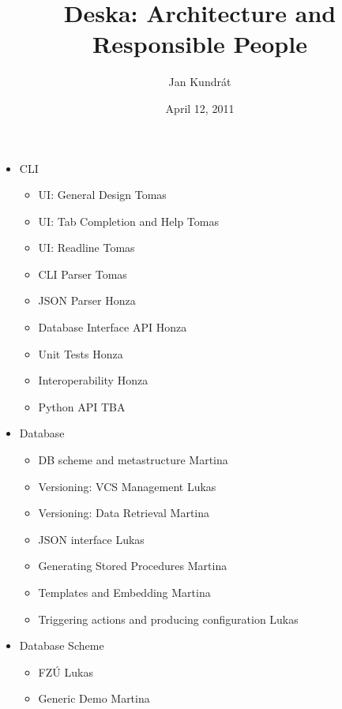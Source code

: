 \documentclass{article}
\begin{document}
\title{Deska: Architecture and Responsible People}

\author{Jan Kundrát}

\date{April 12, 2011}

\maketitle

\TabPositions{12cm}

\begin{itemize}
    \item CLI
        \begin{itemize}
            \item UI: General Design \tab Tomas
            \item UI: Tab Completion and Help \tab Tomas
            \item UI: Readline \tab Tomas
            \item CLI Parser \tab Tomas
            \item JSON Parser \tab Honza
            \item Database Interface API \tab Honza
            \item Unit Tests \tab Honza
            \item Interoperability \tab Honza
            \item Python API \tab TBA
        \end{itemize}
    \item Database
        \begin{itemize}
            \item DB scheme and metastructure \tab Martina
            \item Versioning: VCS Management \tab Lukas
            \item Versioning: Data Retrieval \tab Martina
            \item JSON interface \tab Lukas
            \item Generating Stored Procedures \tab Martina
            \item Templates and Embedding \tab Martina
            \item Triggering actions and producing configuration \tab Lukas
        \end{itemize}
    \item Database Scheme
        \begin{itemize}
            \item FZÚ \tab Lukas
            \item Generic Demo \tab Martina

\end{itemize}
\end{itemize}
\end{document}
